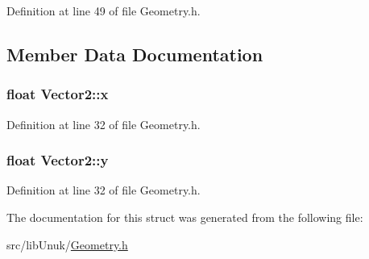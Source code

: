 Definition at line 49 of file Geometry.h.



\subsection{Member Data Documentation}
\hypertarget{struct_vector2_a046bb8d17a876acc49415128dc0502f2}{
\subsubsection[{x}]{\setlength{\rightskip}{0pt plus 5cm}float {\bf Vector2::x}}}
\label{struct_vector2_a046bb8d17a876acc49415128dc0502f2}


Definition at line 32 of file Geometry.h.

\hypertarget{struct_vector2_a0e07bad05f01ed811b909a2eef97f9e2}{
\subsubsection[{y}]{\setlength{\rightskip}{0pt plus 5cm}float {\bf Vector2::y}}}
\label{struct_vector2_a0e07bad05f01ed811b909a2eef97f9e2}


Definition at line 32 of file Geometry.h.



The documentation for this struct was generated from the following file:\begin{DoxyCompactItemize}
\item 
src/libUnuk/\hyperlink{_geometry_8h}{Geometry.h}\end{DoxyCompactItemize}
